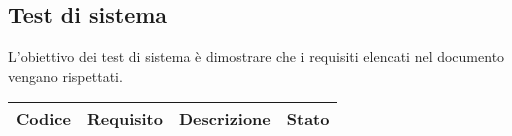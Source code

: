 \subsection{Test di sistema}
L'obiettivo dei test di sistema è dimostrare che i requisiti elencati nel documento \AdR{} \versAdR{} vengano rispettati.
{
    \setlength{\freewidth}{\dimexpr\textwidth-8\tabcolsep}
    \renewcommand{\arraystretch}{1.5}
    \centering
    \setlength{\aboverulesep}{0pt}
    \setlength{\belowrulesep}{0pt}
    \begin{longtable}{C{.20\freewidth} C{.20\freewidth} C{.50\freewidth} C{.10\freewidth}}
        \toprule 
        \textbf{Codice} & \textbf{Requisito} & \textbf{Descrizione} & \textbf{Stato} \\
        \toprule
        \endhead


\end{longtable}}
